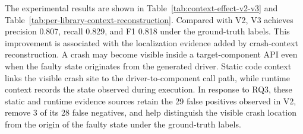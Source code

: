 \documentclass[pdflatex,sn-basic]{sn-jnl}%
\theoremstyle{thmstyleone}%
\theoremstyle{thmstyletwo}%
\theoremstyle{thmstylethree}%
\begin{document}
The experimental results are shown in Table~\ref{tab:context-effect-v2-v3} and Table~\ref{tab:per-library-context-reconstruction}. Compared with V2, V3 achieves precision 0.807, recall 0.829, and F1 0.818 under the ground-truth labels. This improvement is associated with the localization evidence added by crash-context reconstruction. A crash may become visible inside a target-component API even when the faulty state originates from the generated driver. Static code context links the visible crash site to the driver-to-component call path, while runtime context records the state observed during execution. In response to RQ3, these static and runtime evidence sources retain the 29 false positives observed in V2, remove 3 of its 28 false negatives, and help distinguish the visible crash location from the origin of the faulty state under the ground-truth labels.
\end{document}
